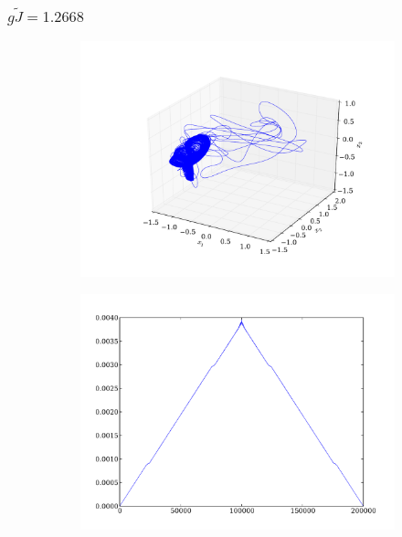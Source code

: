 \documentclass{beamer}
\begin{document}

\begin{frame}
\frametitle{$g\tilde{J} = 1.2668$}
\begin{figure}
	\centering
	\begin{subfigure}[b]{0.49\textwidth}
		\includegraphics[width=\textwidth]{paulfigs/J_1_2668_3d}
	\end{subfigure}
	\begin{subfigure}[b]{0.49\textwidth}
		\includegraphics[width=\textwidth]{paulfigs/tcorr_J_1_2668}
	\end{subfigure}
\end{figure}
\end{frame}
\end{document}
